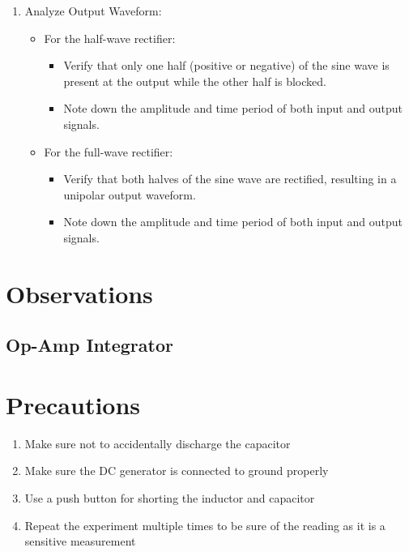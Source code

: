 \documentclass[journal]{IEEEtran}
\begin{document}
\begin{enumerate}
		\item Analyze Output Waveform:
		\begin{itemize}
			\item For the half-wave rectifier:
			\begin{itemize}
				\item Verify that only one half (positive or negative) of the sine wave is present at the output while the other half is blocked.
				\item Note down the amplitude and time period of both input and output signals.
			\end{itemize}
			\item For the full-wave rectifier:
			\begin{itemize}
				\item Verify that both halves of the sine wave are rectified, resulting in a unipolar output waveform.
				\item Note down the amplitude and time period of both input and output signals.
			\end{itemize}
		\end{itemize}
	\end{enumerate}
\section{Observations}
	\subsection{Op-Amp Integrator}

\section{Precautions}

\begin{enumerate}
	\item Make sure not to accidentally discharge the capacitor
	\item Make sure the DC generator is connected to ground properly
	\item Use a push button for shorting the inductor and capacitor
	\item Repeat the experiment multiple times to be sure of the reading as it is a sensitive measurement
\end{enumerate}
\end{document}

